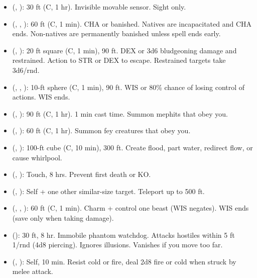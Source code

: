 \begin{itemize}
	\item {} (, ): 30 ft (C, 1 hr). Invisible movable sensor. Sight only.
	\item {} (, , ): 60 ft (C, 1 min). CHA or banished. Natives are incapacitated and CHA ends. Non-natives are permanently banished unless spell ends early.
	\item {} (, ): 20 ft square (C, 1 min), 90 ft. DEX or 3d6 bludgeoning damage and restrained. Action to STR or DEX to escape. Restrained targets take 3d6/rnd.
	\item {} (, , ): 10-ft sphere (C, 1 min), 90 ft. WIS or 80\% chance of losing control of actions. WIS ends.
	\item {} (, ): 90 ft (C, 1 hr). 1 min cast time. Summon mephits that obey you.
	\item {} (, ): 60 ft (C, 1 hr). Summon fey creatures that obey you.
	\item {} (, ): 100-ft cube (C, 10 min), 300 ft. Create flood, part water, redirect flow, or cause whirlpool.
	\item {} (, ): Touch, 8 hrs. Prevent first death or KO.
	\item {} (, ): Self + one other similar-size target. Teleport up to 500 ft.
	\item {} (, , ): 60 ft (C, 1 min). Charm + control one beast (WIS negates). WIS ends (save only when taking damage).
	\item {} (): 30 ft, 8 hr. Immobile phantom watchdog. Attacks hostiles within 5 ft 1/rnd (4d8 piercing). Ignores illusions. Vanishes if you move too far.
	\item {} (, ): Self, 10 min. Resist cold or fire, deal 2d8 fire or cold when struck by melee attack.

\end{itemize}
